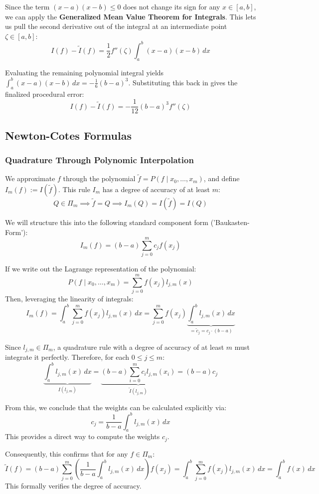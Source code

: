 \documentclass{article}
\begin{document}
Since the term $(x-a)(x-b) \leq 0$ does not change its sign for any $x \in [a,b]$, we can apply the \textbf{Generalized Mean Value Theorem for Integrals}. This lets us pull the second derivative out of the integral at an intermediate point $\zeta \in [a,b]$:
\[I(f) - \tilde{I}(f) = \frac{1}{2} f''(\zeta) \int_a^b (x-a)(x-b) \, dx\]

Evaluating the remaining polynomial integral yields $\int_a^b (x-a)(x-b) \, dx = -\frac{1}{6}(b-a)^3$. Substituting this back in gives the finalized procedural error:
\[I(f) - \tilde{I}(f) = -\frac{1}{12}(b-a)^3 f''(\zeta)\]

\subsection{Newton-Cotes Formulas}
\subsubsection{Quadrature Through Polynomic Interpolation}
We approximate $f$ through the polynomial $\tilde{f} = P(f \mid x_0,\dots,x_m)$, and define $I_m(f) := I(\tilde{f})$.
This rule $I_m$ has a degree of accuracy of at least $m$:
\[Q \in \Pi_m \implies \tilde{f} = Q \implies I_m(Q) = I(\tilde{f}) = I(Q)\]

We will structure this into the following standard component form ('Baukasten-Form'):
\[I_m(f) = (b-a) \sum_{j=0}^m c_j f(x_j)\]

If we write out the Lagrange representation of the polynomial:
\[P(f \mid x_0,\dots,x_m) = \sum_{j=0}^m f(x_j) l_{j,m}(x)\]
Then, leveraging the linearity of integrals:
\[I_m(f) = \int_a^b \sum_{j=0}^m f(x_j) l_{j,m}(x) \, dx = \sum_{j=0}^m f(x_j) \underbrace{\int_a^b l_{j,m}(x) \, dx}_{= \tilde{c}_j = c_j \cdot (b-a)}\]

Since $l_{j,m} \in \Pi_m$, a quadrature rule with a degree of accuracy of at least $m$ must integrate it perfectly. Therefore, for each $0 \leq j \leq m$:
\[\underbrace{\int_a^b l_{j,m}(x) \, dx}_{I(l_{j,m})} = \underbrace{(b-a)\sum_{i=0}^m c_i l_{j,m}(x_i)}_{\tilde{I}(l_{j,m})} = (b-a)c_j\]

From this, we conclude that the weights can be calculated explicitly via:
\[c_j = \frac{1}{b-a}\int_a^b l_{j,m}(x) \, dx\]
This provides a direct way to compute the weights $c_j$.

Consequently, this confirms that for any $f \in \Pi_m$:
\[\tilde{I}(f) = (b-a)\sum_{j=0}^m \left(\frac{1}{b-a}\int_a^b l_{j,m}(x) \, dx\right) f(x_j) = \int_a^b \sum_{j=0}^m f(x_j) l_{j,m}(x) \, dx = \int_a^b f(x) \, dx\]
This formally verifies the degree of accuracy.
\end{document}
